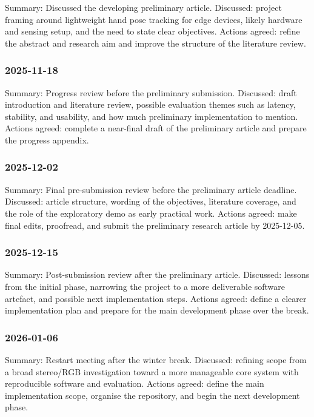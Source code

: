 ﻿\documentclass[11pt,a4paper]{article}
\begin{document}
Summary: Discussed the developing preliminary article.
Discussed: project framing around lightweight hand pose tracking for edge
devices, likely hardware and sensing setup, and the need to state clear
objectives.
Actions agreed: refine the abstract and research aim and improve the structure
of the literature review.

\subsubsection*{2025-11-18}

Summary: Progress review before the preliminary submission.
Discussed: draft introduction and literature review, possible evaluation themes
such as latency, stability, and usability, and how much preliminary
implementation to mention.
Actions agreed: complete a near-final draft of the preliminary article and
prepare the progress appendix.

\subsubsection*{2025-12-02}

Summary: Final pre-submission review before the preliminary article deadline.
Discussed: article structure, wording of the objectives, literature coverage,
and the role of the exploratory demo as early practical work.
Actions agreed: make final edits, proofread, and submit the preliminary
research article by 2025-12-05.

\subsubsection*{2025-12-15}

Summary: Post-submission review after the preliminary article.
Discussed: lessons from the initial phase, narrowing the project to a more
deliverable software artefact, and possible next implementation steps.
Actions agreed: define a clearer implementation plan and prepare for the main
development phase over the break.

\subsubsection*{2026-01-06}

Summary: Restart meeting after the winter break.
Discussed: refining scope from a broad stereo/RGB investigation toward a more
manageable core system with reproducible software and evaluation.
Actions agreed: define the main implementation scope, organise the repository,
and begin the next development phase.
\end{document}
